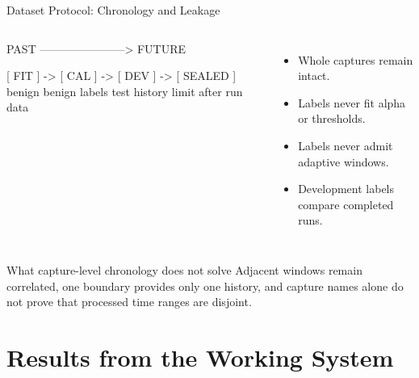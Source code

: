 \documentclass[aspectratio=169,10pt]{beamer}
\begin{document}
\begin{frame}[fragile]{Dataset Protocol: Chronology and Leakage}
\begin{columns}[T,onlytextwidth]
\begin{asciiart}
PAST -----------------------> FUTURE

[ FIT ] -> [ CAL ] -> [ DEV ] -> [ SEALED ]
 benign    benign    labels       test
 history   limit     after run     data
\end{asciiart}

\begin{itemize}
  \item Whole captures remain intact.
  \item Labels never fit alpha or thresholds.
  \item Labels never admit adaptive windows.
  \item Development labels compare completed runs.
\end{itemize}
\end{columns}

\vspace{0.35cm}
\begin{alertblock}{What capture-level chronology does not solve}
Adjacent windows remain correlated, one boundary provides only one history, and
capture names alone do not prove that processed time ranges are disjoint.
\end{alertblock}
\end{frame}

\section{Results from the Working System}
\end{document}
